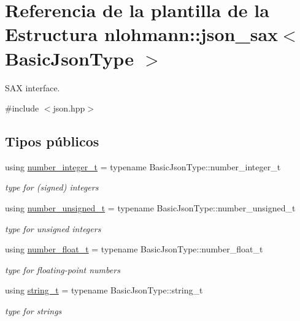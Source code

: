 \hypertarget{structnlohmann_1_1json__sax}{}\section{Referencia de la plantilla de la Estructura nlohmann\+:\+:json\+\_\+sax$<$ Basic\+Json\+Type $>$}
\label{structnlohmann_1_1json__sax}


S\+AX interface.  




{\ttfamily \#include $<$json.\+hpp$>$}

\subsection*{Tipos públicos}
\begin{DoxyCompactItemize}
\item 
\mbox{\label{structnlohmann_1_1json__sax_a0cef30121f02b7fee85e9708148ea0aa}} 
using \mbox{\hyperlink{structnlohmann_1_1json__sax_a0cef30121f02b7fee85e9708148ea0aa}{number\+\_\+integer\+\_\+t}} = typename Basic\+Json\+Type\+::number\+\_\+integer\+\_\+t
\begin{DoxyCompactList}\small\item\em type for (signed) integers \end{DoxyCompactList}\item 
\mbox{\label{structnlohmann_1_1json__sax_a32028cc056ae0f43aaae331cdbbbf856}} 
using \mbox{\hyperlink{structnlohmann_1_1json__sax_a32028cc056ae0f43aaae331cdbbbf856}{number\+\_\+unsigned\+\_\+t}} = typename Basic\+Json\+Type\+::number\+\_\+unsigned\+\_\+t
\begin{DoxyCompactList}\small\item\em type for unsigned integers \end{DoxyCompactList}\item 
\mbox{\label{structnlohmann_1_1json__sax_a390c209bffd8c4800c8f3076dc465a20}} 
using \mbox{\hyperlink{structnlohmann_1_1json__sax_a390c209bffd8c4800c8f3076dc465a20}{number\+\_\+float\+\_\+t}} = typename Basic\+Json\+Type\+::number\+\_\+float\+\_\+t
\begin{DoxyCompactList}\small\item\em type for floating-\/point numbers \end{DoxyCompactList}\item 
\mbox{\label{structnlohmann_1_1json__sax_ae01977a9f3c5b3667b7a2929ed91061e}} 
using \mbox{\hyperlink{structnlohmann_1_1json__sax_ae01977a9f3c5b3667b7a2929ed91061e}{string\+\_\+t}} = typename Basic\+Json\+Type\+::string\+\_\+t
\begin{DoxyCompactList}\small\item\em type for strings \end{DoxyCompactList}\end{DoxyCompactItemize}

